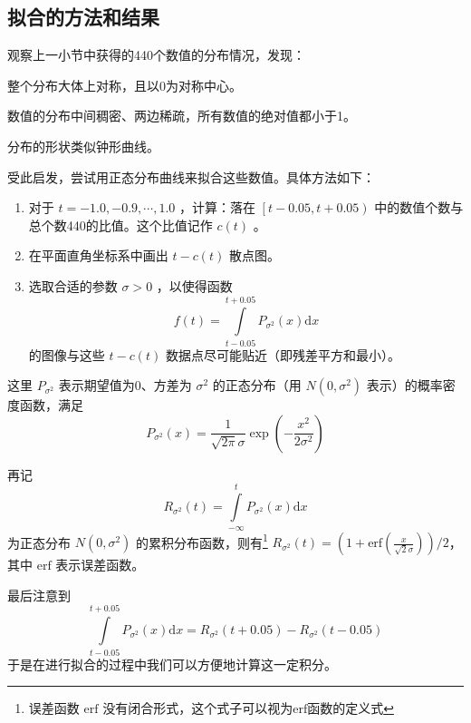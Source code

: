     \subsection{拟合的方法和结果}

        观察上一小节中获得的440个数值的分布情况，发现：
        \begin{asparaitem}
            \item 整个分布大体上对称，且以$0$为对称中心。
            \item 数值的分布中间稠密、两边稀疏，所有数值的绝对值都小于1。
            \item 分布的形状类似钟形曲线。
        \end{asparaitem}
        
        \vspace{1.5ex}

        受此启发，尝试用正态分布曲线来拟合这些数值。具体方法如下：
        \begin{enumerate}[leftmargin=6em]
            \item [\textbf{步骤 1.}] 对于 $t=-1.0,-0.9,\cdots,1.0$ ，计算：落在 $\left[t-0.05,t+0.05\right)$ 中的数值个数与总个数440的比值。这个比值记作 $c(t)$ 。
            \item [\textbf{步骤 2.}] 在平面直角坐标系中画出 $t-c(t)$ 散点图。
            \item [\textbf{步骤 3.}] 选取合适的参数 $\sigma>0$ ，以使得函数 $$ f(t)=\displaystyle\int\limits_{t-0.05}^{t+0.05} P_{\sigma^2}(x)\mathrm{d} x$$ 的图像与这些 $t-c(t)$ 数据点尽可能贴近（即残差平方和最小）。
        \end{enumerate}

        这里 $P_{\sigma^2}$ 表示期望值为0、方差为 $\sigma^2$ 的正态分布（用 $N(0,\sigma^2)$ 表示）的概率密度函数，满足 $$P_{\sigma^2}(x)=\frac{1}{\sqrt{2\pi}\sigma}\exp{\left(-\frac{x^2}{2\sigma^2}\right)}$$

        再记 $$R_{\sigma^2}(t)=\int\limits_{-\infty}^t P_{\sigma^2}(x)\mathrm{d}x$$ 为正态分布 $N(0,\sigma^2)$ 的累积分布函数，则有\footnote{误差函数 $\mathrm{erf}$ 没有闭合形式，这个式子可以视为$\mathrm{erf}$函数的定义式} $R_{\sigma^2}(t)=\left(1+\mathrm{erf}\left(\frac x{\sqrt{2}\sigma}\right)\right)/2$\nobreak，其中 $\mathrm{erf}$ 表示误差函数。

        最后注意到 $$\int\limits_{t-0.05}^{t+0.05} P_{\sigma^2}(x)\mathrm{d} x=R_{\sigma^2}(t+0.05)-R_{\sigma^2}(t-0.05)$$ 于是在进行拟合的过程中我们可以方便地计算这一定积分。

